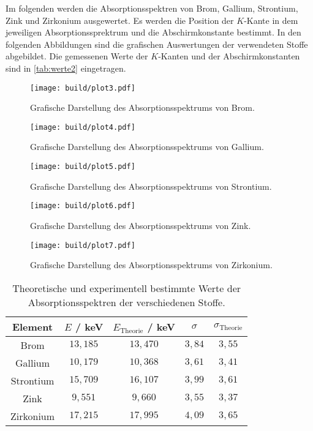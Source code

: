 Im folgenden werden die Absorptionsspektren von Brom, Gallium, Strontium, Zink und Zirkonium ausgewertet.
Es werden die Position der $K$-Kante in dem jeweiligen Absorptionssprektrum und die Abschirmkonstante bestimmt.
In den folgenden Abbildungen sind die grafischen Auswertungen der verwendeten Stoffe abgebildet.
Die gemessenen Werte der $K$-Kanten und der Abschirmkonstanten sind in \autoref{tab:werte2} eingetragen.

\begin{figure}[H]
  \centering
  \texttt{[image: build/plot3.pdf]}
  \caption{Grafische Darstellung des Absorptionsspektrums von Brom.}
  \label{fig:plot3}
\end{figure}

\begin{figure}[H]
  \centering
  \texttt{[image: build/plot4.pdf]}
  \caption{Grafische Darstellung des Absorptionsspektrums von Gallium.}
  \label{fig:plot4}
\end{figure}

\begin{figure}[H]
  \centering
  \texttt{[image: build/plot5.pdf]}
  \caption{Grafische Darstellung des Absorptionsspektrums von Strontium.}
  \label{fig:plot5}
\end{figure}

\begin{figure}[H]
  \centering
  \texttt{[image: build/plot6.pdf]}
  \caption{Grafische Darstellung des Absorptionsspektrums von Zink.}
  \label{fig:plot6}
\end{figure}

\begin{figure}[H]
  \centering
  \texttt{[image: build/plot7.pdf]}
  \caption{Grafische Darstellung des Absorptionsspektrums von Zirkonium.}
  \label{fig:plot7}
\end{figure}


\begin{table}[H]
  \caption{Theoretische und experimentell bestimmte Werte der Absorptionsspektren der verschiedenen Stoffe.}
  \centering
  \label{tab:werte2}
  \begin{tabular}{c| c c c c}
      \toprule
      Element  & $E$ / keV & $E_{\text{Theorie}}$ / keV & $\sigma$ & $\sigma_{\text{Theorie}}$ \\
      \midrule
      Brom      & $13,185$  & $13,470$  & $3,84$ & $3,55$ \\
      Gallium   & $10,179$  & $10,368$  & $3,61$ & $3,41$ \\
      Strontium & $15,709$  & $16,107$  & $3,99$ & $3,61$ \\
      Zink      & $9,551$   & $9,660$   & $3,55$ & $3,37$ \\
      Zirkonium & $17,215$  & $17,995$  & $4,09$ & $3,65$ \\
      \bottomrule
  \end{tabular}
\end{table}

